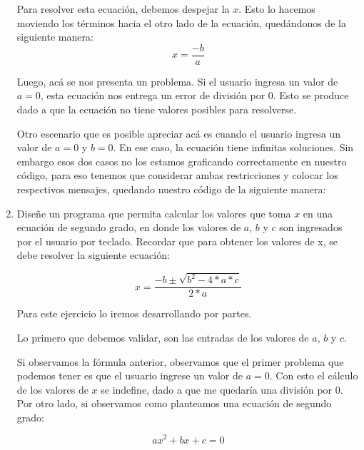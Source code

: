 \begin{enumerate}[{Ejercicio} 1.]
    \asw Para resolver esta ecuación, debemos despejar la \(x\). Esto lo hacemos moviendo los términos hacia el otro lado de la ecuación, quedándonos de la siguiente manera:\\

    \[ x = \frac{-b}{a} \]

    \begin{listing}[H]
    \end{listing}

    Luego, acá se nos presenta un problema. Si el usuario ingresa un valor de \(a = 0\), esta ecuación nos entrega un error de división por 0. Esto se produce dado a que la ecuación no tiene valores posibles para resolverse.

    Otro escenario que es posible apreciar acá es cuando el usuario ingresa un valor de \(a=0\) y \(b=0\). En ese caso, la ecuación tiene infinitas soluciones. Sin embargo esos dos casos no los estamos graficando correctamente en nuestro código, para eso tenemos que considerar ambas restricciones y colocar los respectivos mensajes, quedando nuestro código de la siguiente manera:\\

    \begin{listing}[H]
    \end{listing}

    \item Diseñe un programa que permita calcular los valores que toma \(x\) en una ecuación de segundo grado, en donde los valores de \(a\), \(b\) y \(c\) son ingresados por el usuario por teclado. Recordar que para obtener los valores de x, se debe resolver la siguiente ecuación:
    
    \[ x = \frac{-b \pm \sqrt{b^2 - 4*a*c}}{2*a}\]

    \asw Para este ejercicio lo iremos desarrollando por partes. 
    
    Lo primero que debemos validar, son las entradas de los valores de \(a\), \(b\) y \(c\).

    Si observamos la fórmula anterior, observamos que el primer problema que podemos tener es que el usuario ingrese un valor de \(a=0\). Con esto el cálculo de los valores de \(x\) se indefine, dado a que me quedaría una división por 0. Por otro lado, si observamos como planteamos una ecuación de segundo grado:

    \[ ax^2 + bx + c = 0 \]


\end{enumerate}
